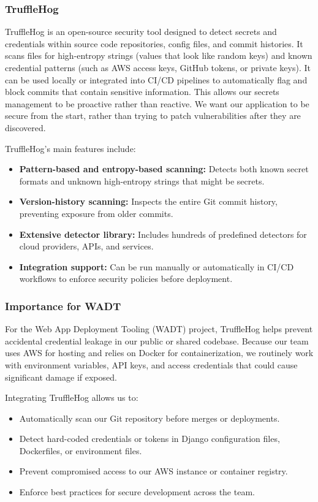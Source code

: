 \documentclass[12pt]{article}
\begin{document}
\subsubsection{TruffleHog}
TruffleHog is an open-source security tool designed to detect secrets and credentials within source code repositories, config files, and commit histories. It scans files for high-entropy strings (values that look like random keys) and known credential patterns (such as AWS access keys, GitHub tokens, or private keys). It can be used locally or integrated into CI/CD pipelines to automatically flag and block commits that contain sensitive information. This allows our secrets management to be proactive rather than reactive. We want our application to be secure from the start, rather than trying to patch vulnerabilities after they are discovered. 

TruffleHog’s main features include:
\begin{itemize}
    \item \textbf{Pattern-based and entropy-based scanning:} Detects both known secret formats and unknown high-entropy strings that might be secrets. 
    \item \textbf{Version-history scanning:} Inspects the entire Git commit history, preventing exposure from older commits.
    \item \textbf{Extensive detector library:} Includes hundreds of predefined detectors for cloud providers, APIs, and services.
    \item \textbf{Integration support:} Can be run manually or automatically in CI/CD workflows to enforce security policies before deployment.
\end{itemize}

\subsubsection{Importance for WADT}
For the Web App Deployment Tooling (WADT) project, TruffleHog helps prevent accidental credential leakage in our public or shared codebase. Because our team uses AWS for hosting and relies on Docker for containerization, we routinely work with environment variables, API keys, and access credentials that could cause significant damage if exposed.

Integrating TruffleHog allows us to:
\begin{itemize}
    \item Automatically scan our Git repository before merges or deployments.
    \item Detect hard-coded credentials or tokens in Django configuration files, Dockerfiles, or environment files.
    \item Prevent compromised access to our AWS instance or container registry.
    \item Enforce best practices for secure development across the team.
\end{itemize}
\end{document}
